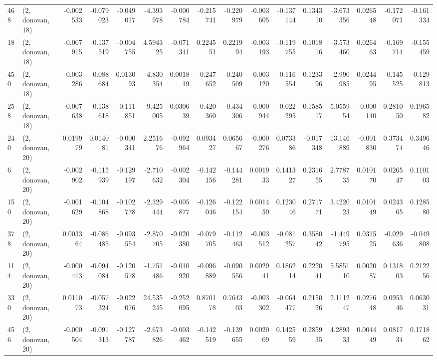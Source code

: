 \begin{tabular}{llrrrrrrrrrrrrrr}
468 &  (2, donovan, 18) &  -0.002533 & -0.079023 & -0.049017 &  -4.393978 & -0.000784 &  -0.215741 & -0.220979 & -0.003605 & -0.137144 &  0.134310 &    -3.673356 &   0.026548 &  -0.172071 &  -0.161334 \\
18  &  (2, donovan, 18) &  -0.007915 & -0.137519 & -0.004755 &   4.594325 & -0.071341 &   0.224551 &  0.221994 & -0.003193 & -0.119755 &  0.101816 &    -3.573460 &   0.026463 &  -0.169714 &  -0.155459 \\
450 &  (2, donovan, 18) &  -0.003286 & -0.088684 &  0.013093 &  -4.830354 &  0.001819 &  -0.247652 & -0.240509 & -0.003120 & -0.116554 &  0.123396 &    -2.990985 &   0.024495 &  -0.145525 &  -0.129813 \\
258 &  (2, donovan, 18) &  -0.007638 & -0.138618 & -0.111851 &  -9.425005 &  0.030639 &  -0.420360 & -0.434306 & -0.000944 & -0.022295 &  0.158517 &     5.055954 &  -0.000140 &   0.281050 &   0.196582 \\
240 &  (2, donovan, 20) &   0.019979 &  0.014081 & -0.000341 &   2.251676 & -0.092964 &   0.093427 &  0.065667 & -0.000276 &  0.073386 & -0.017348 &    13.146889 &  -0.001830 &   0.373474 &   0.349646 \\
6   &  (2, donovan, 20) &  -0.002902 & -0.115939 & -0.129197 &  -2.710632 & -0.002304 &  -0.142156 & -0.144281 &  0.001933 &  0.141327 &  0.231655 &     2.778735 &   0.010170 &   0.026547 &   0.110103 \\
150 &  (2, donovan, 20) &  -0.001629 & -0.104868 & -0.102778 &  -2.329444 & -0.005877 &  -0.126046 & -0.122154 &  0.001459 &  0.123046 &  0.271771 &     3.422023 &   0.010149 &   0.024365 &   0.128580 \\
378 &  (2, donovan, 20) &   0.003364 & -0.086485 & -0.093554 &  -2.870705 & -0.020380 &  -0.079705 & -0.112463 & -0.003512 & -0.081257 &  0.358042 &    -1.449795 &   0.031525 &  -0.029636 &  -0.049808 \\
114 &  (2, donovan, 20) &  -0.000413 & -0.094084 & -0.120578 &  -1.751486 & -0.010920 &  -0.096889 & -0.090556 &  0.002941 &  0.186214 &  0.222041 &     5.585110 &   0.002087 &   0.131803 &   0.212256 \\
330 &  (2, donovan, 20) &   0.011073 & -0.057324 & -0.022076 &  24.535245 & -0.252095 &   0.870178 &  0.764303 & -0.003302 & -0.064477 &  0.215026 &     2.111247 &   0.027648 &   0.095346 &   0.063031 \\
456 &  (2, donovan, 20) &  -0.000504 & -0.091313 & -0.127787 &  -2.673826 & -0.003462 &  -0.142519 & -0.139655 &  0.002009 &  0.142559 &  0.285935 &     4.289333 &   0.004449 &   0.081734 &   0.171862 \\

\end{tabular}
